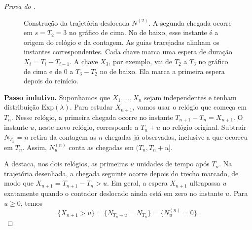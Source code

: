 \documentclass[12pt,portuguese]{article}
\theoremstyle{definition}
\theoremstyle{plainexercise}
\theoremstyle{starredexercise}
\theoremstyle{definition}
\begin{document}
\begin{proof}[Prova do ]
\begin{figure}[H]
  \caption{Construção da trajetória deslocada $N^{(2)}$. A segunda chegada
    ocorre em $s=T_2=3$ no gráfico de cima. No de baixo, esse instante é a
    origem do relógio e da contagem. As guias tracejadas alinham os instantes
    correspondentes. Cada chave marca uma espera de duração
    $X_i=T_i-T_{i-1}$. A chave $X_3$, por exemplo, vai de $T_2$ a $T_3$
    no gráfico de cima e de $0$ a $T_3-T_2$ no de baixo. Ela marca a
    primeira espera depois do reinício.}
  \label{fig:construcao-trajetoria-deslocada}
\end{figure}

\smallskip
\noindent\textbf{Passo indutivo.}
Suponhamos que $X_1,\ldots,X_n$ sejam independentes e tenham distribuição
$\mathrm{Exp}(\lambda)$. Para estudar $X_{n+1}$, vamos usar o relógio que
começa em $T_n$. Nesse relógio, a primeira chegada ocorre no instante
$T_{n+1}-T_n=X_{n+1}$. O instante $u$, neste novo relógio, corresponde a $T_n+u$ no relógio
original. Subtrair $N_{T_n}=n$ retira da contagem as $n$ chegadas já
observadas, inclusive a que ocorreu em $T_n$. 
Assim, $N^{(n)}_u$ conta as chegadas em $(T_n,T_n+u]$.

A  destaca, nos dois relógios, as
primeiras $u$ unidades de tempo após $T_n$. Na trajetória desenhada,
a chegada seguinte ocorre depois do trecho marcado, de modo que
$X_{n+1}=T_{n+1}-T_n>u$. Em geral, a espera $X_{n+1}$ ultrapassa $u$
exatamente quando o contador deslocado ainda está em zero no instante $u$.
Para $u\geqslant 0$, temos
\begin{equation}\label{eq:cauda-xn-mais-um}
  \{X_{n+1}>u\}=\{N_{T_n+u}=N_{T_n}\}=\{N^{(n)}_u=0\}.
\end{equation}


\end{proof}
\end{document}
